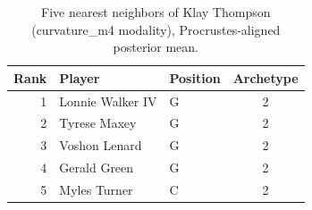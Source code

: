 \begin{table}[htbp]
  \centering\small
  \begin{tabular}{rllc}
    \toprule
    Rank & Player & Position & Archetype \\
    \midrule
    1 & Lonnie Walker IV & G & 2 \\
    2 & Tyrese Maxey & G & 2 \\
    3 & Voshon Lenard & G & 2 \\
    4 & Gerald Green & G & 2 \\
    5 & Myles Turner & C & 2 \\
    \bottomrule
  \end{tabular}
  \caption{Five nearest neighbors of Klay Thompson (curvature_m4 modality), Procrustes-aligned posterior mean.}
  \label{tab:Klay_Thompson_neighbors_curvature_m4}
\end{table}

